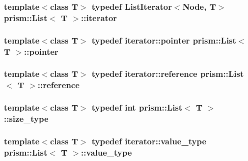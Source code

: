 \subsubsection[{\texorpdfstring{iterator}{iterator}}]{\setlength{\rightskip}{0pt plus 5cm}template$<$class T$>$ typedef List\+Iterator$<$Node, T$>$ {\bf prism\+::\+List}$<$ T $>$\+::{\bf iterator}}\hypertarget{classprism_1_1_list_a6cf00c98a428ed325fe9ccc60d7ef95a}{}\label{classprism_1_1_list_a6cf00c98a428ed325fe9ccc60d7ef95a}
\subsubsection[{\texorpdfstring{pointer}{pointer}}]{\setlength{\rightskip}{0pt plus 5cm}template$<$class T$>$ typedef iterator\+::pointer {\bf prism\+::\+List}$<$ T $>$\+::{\bf pointer}}\hypertarget{classprism_1_1_list_aed257df5c1db1015841de21318b6c5c2}{}\label{classprism_1_1_list_aed257df5c1db1015841de21318b6c5c2}
\subsubsection[{\texorpdfstring{reference}{reference}}]{\setlength{\rightskip}{0pt plus 5cm}template$<$class T$>$ typedef iterator\+::reference {\bf prism\+::\+List}$<$ T $>$\+::{\bf reference}}\hypertarget{classprism_1_1_list_aace7abca3cacb471bba9f04bba680fc3}{}\label{classprism_1_1_list_aace7abca3cacb471bba9f04bba680fc3}
\subsubsection[{\texorpdfstring{size\+\_\+type}{size_type}}]{\setlength{\rightskip}{0pt plus 5cm}template$<$class T$>$ typedef int {\bf prism\+::\+List}$<$ T $>$\+::{\bf size\+\_\+type}}\hypertarget{classprism_1_1_list_a1d3fe26a6fe0ec8f6a63e70bb59979bd}{}\label{classprism_1_1_list_a1d3fe26a6fe0ec8f6a63e70bb59979bd}
\subsubsection[{\texorpdfstring{value\+\_\+type}{value_type}}]{\setlength{\rightskip}{0pt plus 5cm}template$<$class T$>$ typedef iterator\+::value\+\_\+type {\bf prism\+::\+List}$<$ T $>$\+::{\bf value\+\_\+type}}\hypertarget{classprism_1_1_list_a7f20672ea7b8f748420548308e07dbc1}{}\label{classprism_1_1_list_a7f20672ea7b8f748420548308e07dbc1}


